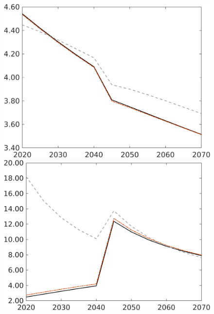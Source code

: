 \begin{figure}[h!!!]
\begin{minipage}[]{0.32\textwidth}
	\end{minipage}
	\begin{minipage}[]{0.32\textwidth}
		\includegraphics[width=1\textwidth]{../../codding_model/own_basedOnFried/optimalPol_010922_revision/figures/all_13Sept22/CompRed_Taul0_gAn_spillover0_knspil0_nsk0_xgr0_sep0_LFlimit1_emsbase0_countec0_GovRev0_etaa0.79_lgd0.png}
	\end{minipage}
	\begin{minipage}[]{0.32\textwidth}
		\includegraphics[width=1\textwidth]{../../codding_model/own_basedOnFried/optimalPol_010922_revision/figures/all_13Sept22/CompRed_Taul0_gAg_spillover0_knspil0_nsk0_xgr0_sep0_LFlimit1_emsbase0_countec0_GovRev0_etaa0.79_lgd0.png}
	\end{minipage}
\end{figure}

